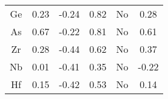\begin{table}[ht]
\begin{tabular}{cccccc}
Ge      & 0.23                                                      & -0.24                                                        & 0.82                                                      & No                                                                       & 0.28                                                           \\
As      & 0.67                                                      & -0.22                                                        & 0.81                                                      & No                                                                       & 0.61                                                           \\
Zr      & 0.28                                                      & -0.44                                                        & 0.62                                                      & No                                                                       & 0.37                                                           \\
Nb      & 0.01                                                      & -0.41                                                        & 0.35                                                      & No                                                                       & -0.22                                                          \\
Hf      & 0.15                                                      & -0.42                                                        & 0.53                                                      & No                                                                       & 0.14                                                           \\ \hline\hline
\end{tabular}
\end{table}